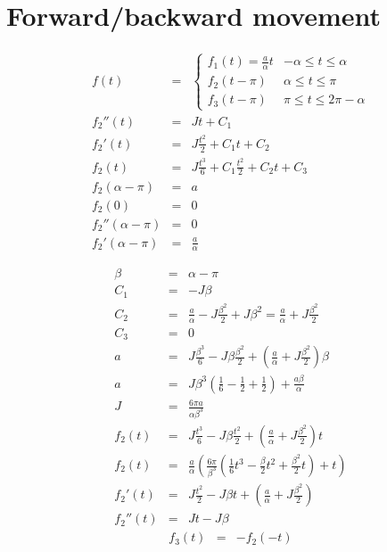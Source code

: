 \documentclass[a4,draft]{article}
\begin{document}
\section{Forward/backward movement}

\begin{eqnarray}
  f(t) &=& \begin{cases} 
    f_1(t)=\frac{a}{\alpha}t & -\alpha \leq t \le  \alpha\\
    f_2(t - \pi) & \alpha \leq t \le  \pi \\
    f_3(t - \pi) &  \pi \leq t \le  2\pi -\alpha
  \end{cases}\\
  f_2''(t) &=& Jt + C_1\\
  f_2'(t) &=& J\frac{t^2}{2} + C_1t + C_2 \\
  f_2(t) &=& J\frac{t^3}{6} + C_1\frac{t^2}{2} + C_2t + C_3 \\
  f_2(\alpha - \pi) &=& a \\
  f_2(0) &=& 0 \\
  f_2''(\alpha - \pi) &=& 0 \\
  f_2'(\alpha - \pi) &=& \frac{a}{\alpha}
\end{eqnarray}

\begin{eqnarray}
  \beta &=& \alpha - \pi \\
  C_1 &=& -J\beta \\
  C_2 &=& \frac{a}{\alpha} - J\frac{\beta^2}{2} +J\beta^2 = \frac{a}{\alpha} + J\frac{\beta^2}{2}\\
  C_3 &=& 0 \\
  a &=&J\frac{\beta^3}{6} -J\beta\frac{\beta^2}{2} + \left(\frac{a}{\alpha} + J\frac{\beta^2}{2}\right)\beta \\
  a &=& J\beta^3\left(\frac{1}{6} - \frac{1}{2} + \frac{1}{2}\right) + \frac{a\beta}{\alpha} \\
  J &=& \frac{6\pi a}{\alpha \beta^3} \\
  f_2(t) &=& J\frac{t^3}{6} -J\beta\frac{t^2}{2} + \left(\frac{a}{\alpha} + J\frac{\beta^2}{2}\right) t \\
  f_2(t) &=& \frac{a}{\alpha} \left( \frac{6\pi}{\beta^3}\left(\frac{1}{6}t^3 -\frac{\beta}{2}t^2 + \frac{\beta^2}{2} t \right) +  t \right) \\
  f_2'(t) &=& J\frac{t^2}{2} -J\beta t + \left(\frac{a}{\alpha} + J\frac{\beta^2}{2}\right) \\
  f_2''(t) &=& J t - J\beta
\end{eqnarray}
\begin{eqnarray}
  f_3(t) &=& -f_2(-t)
\end{eqnarray}
\end{document}
